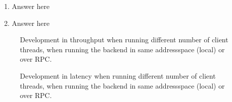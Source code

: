 \documentclass[11pt,a4paper,english]{article}
\newcommand{\todo}[1]{\textcolor{red}{\textbf{TODO: }#1}}
\begin{document}
\begin{enumerate}
  \todo{hardware employed}

  We use the handout values for warmup runs (100) and actual runs (500).

  \todo{measurement procedures (e.g., number of repetitions, statistics used such as average or deviation),}

\item Answer here

\item Answer here
\end{enumerate}


\begin{figure}
  \centering
  \caption{Development in throughput when running different number of
    client threads, when running the backend in same addressspace (local) or
    over RPC.}
  \label{fig:throughput}
\end{figure}

\begin{figure}
  \centering
  \caption{Development in latency when running different number of
    client threads, when running the backend in same addressspace (local) or
    over RPC.}
  \label{fig:latency}
\end{figure}
\end{document}
